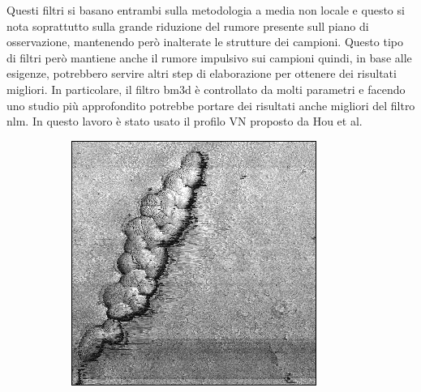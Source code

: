 \documentclass[../main.tex]{subfiles}
\begin{document}
Questi filtri si basano entrambi sulla metodologia a media non locale e questo si nota soprattutto sulla grande riduzione del rumore presente sull piano di osservazione, mantenendo però inalterate le strutture dei campioni. Questo tipo di filtri però mantiene anche il rumore impulsivo sui campioni quindi, in base alle esigenze, potrebbero servire altri step di elaborazione per ottenere dei risultati migliori. In particolare, il filtro \acrshort{bm3d} è controllato da molti parametri e facendo uno studio più approfondito potrebbe portare dei risultati anche migliori del filtro \acrshort{nlm}. In questo lavoro è stato usato il profilo VN proposto da Hou et al.\cite{hou_2011}

\newpage
\null
\vfill
\begin{figure}[!ht]
	\centering
	\begin{subfigure}{0.3\linewidth}
		\centering
		\includegraphics[keepaspectratio, width=\linewidth]{images/ef_o2a_orig.png}
	\end{subfigure}
	\hfill
	\begin{subfigure}{0.3\linewidth}
		\centering

\end{subfigure}
\end{figure}
\end{document}
